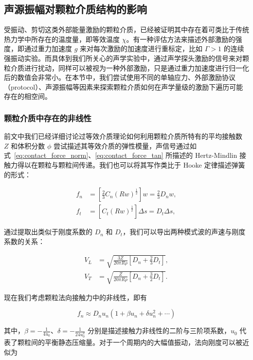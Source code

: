 \subsection{声源振幅对颗粒介质结构的影响}

受振动、剪切这类外部能量激励的颗粒介质，已经被证明其中存在着可类比于传统热力学中所存在的温度量，即等效温度 $\chi$。有一种评估方法来描述外部激励的强度，即通过重力加速度 $g$ 来对每次激励的加速度进行重标定，比如 $\Gamma>1$ 的连续强振动实验。而具体到我们所关心的声学实验中，通过声学探头激励的信号来对颗粒介质进行扰动，同样可以被视为一种外部激励，只是通过重力加速度进行归一化后的数值会非常小。在本节中，我们尝试使用不同的单轴应力、外部激励协议（protocol）、声源振幅等因素来探索颗粒介质如何在声学量级的激励下遍历可能存在的相空间。


\subsubsection{颗粒介质中存在的非线性}

前文中我们已经详细讨论过等效介质理论如何利用颗粒介质所特有的平均接触数 $Z$ 和体积分数 $\phi$ 尝试描述其等效介质的弹性模量，声信号通过如式~\eqref{eq:contact_force_norm}、\eqref{eq:contact_force_tan} 所描述的 Hertz-Mindlin 接触力得以在颗粒与颗粒间传递。我们也可以将其写作类比于 Hooke 定律描述弹簧的形式：

\begin{align}
  f_{n} &= \left[\frac{2}{3}C_{n}(Rw)^{\frac{1}{2}}\right]w = \frac{2}{3}D_{n}w,\\
  f_{t} &= \left[C_{t}(Rw)^{\frac{1}{2}}\right]\Delta s = D_{t}\Delta s,
\end{align}

通过提取出类似于刚度系数的 $D_{n}$ 和 $D_{t}$，我们可以导出两种模式波的声速与刚度系数的关系\cite{doi.org/10.1029/GL010i011p01073}：

\begin{align}
  V_{L} &= \sqrt{\frac{3Z}{20\pi R\rho}\left[D_{n} + \frac{2}{3}D_{t}\right]},\\
  V_{T} &= \sqrt{\frac{ Z}{20\pi R\rho}\left[D_{n} + \frac{3}{2}D_{t}\right]}.
\end{align}

现在我们考虑颗粒法向接触力中的非线性，即有

\begin{equation}
  f_{n} \approx D_{n}u_{n}\left(1 + \beta u_{n} + \delta u_{n}^{2} + \cdots\right)
\end{equation}

其中，$\beta = -\frac{1}{4u_{0}}$、$\delta = -\frac{1}{24u_{0}^{2}}$ 分别是描述接触力非线性的二阶与三阶项系数，$u_{0}$ 代表了颗粒间的平衡静态压缩量。对于一个周期内的大幅值振动，法向刚度可以被近似为

